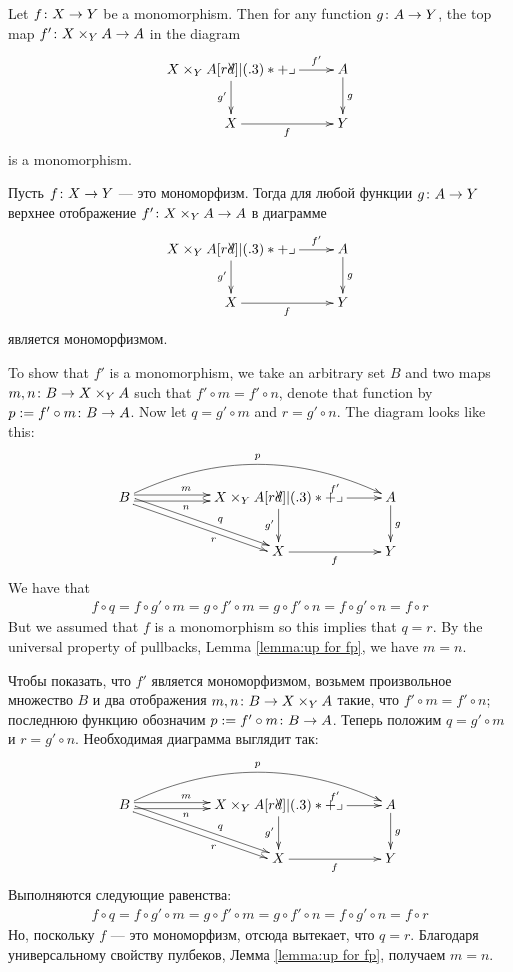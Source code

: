 \documentclass[CT4S-EN-RU]{subfiles}
\begin{document}
\begin{propositionENG}\label{prop:pb preserve mono}
Let $f\colon X\rightarrow Y$ be a monomorphism. Then for any function $g\colon A\rightarrow Y$, the top map $f'\colon X\times_YA\rightarrow A$ in the diagram
$$
\xymatrix{X\times_YA\ar[r]^-{f'}\ar[d]_{g'}\ullimit&A\ar[d]^g\\X\ar[r]_f&Y}
$$
is a monomorphism.
\end{propositionENG}

\begin{propositionRUS}\label{prop:pb preserve mono}
Пусть $f\colon X\rightarrow Y$ — это мономорфизм. Тогда для любой функции $g\colon A\rightarrow Y$ верхнее отображение $f'\colon X\times_YA\rightarrow A$ в диаграмме
$$
\xymatrix{X\times_YA\ar[r]^-{f'}\ar[d]_{g'}\ullimit&A\ar[d]^g\\X\ar[r]_f&Y}
$$
является мономорфизмом.
\end{propositionRUS}

\begin{proofENG}
To show that $f'$ is a monomorphism, we take an arbitrary set $B$ and two maps $m,n\colon B\rightarrow X\times_YA$ such that $f'\circ m=f'\circ n$, denote that function by $p:=f'\circ m\colon B\rightarrow A$. Now let $q=g'\circ m$ and $r=g'\circ n$. The diagram looks like this:
$$
\xymatrix{B\ar@<.5ex>[rr]^(.4)m\ar@<-.5ex>[rr]_(.4)n\ar@/^2pc/[rrr]^p\ar@<.5ex>[drr]^(.6)q\ar@<-.5ex>[drr]_(.6)r&&X\times_YA\ar[r]^{f'}\ar[d]_{g'}\ullimit&A\ar[d]^g\\&&X\ar[r]_f&Y}
$$
We have that 
\begin{align*}f\circ q=f\circ g'\circ m=g\circ f'\circ m=g\circ f'\circ n=f\circ g'\circ n=f\circ r\end{align*} 
But we assumed that $f$ is a monomorphism so this implies that $q=r$. By the universal property of pullbacks, Lemma \ref{lemma:up for fp}, we have $m=n$.
\end{proofENG}

\begin{proofRUS}
Чтобы показать, что $f'$ является мономорфизмом, возьмем произвольное множество $B$ и два отображения $m,n\colon B\rightarrow X\times_YA$ такие, что $f'\circ m=f'\circ n$; последнюю функцию обозначим $p:=f'\circ m\colon B\rightarrow A$. Теперь положим $q=g'\circ m$ и $r=g'\circ n$. Необходимая диаграмма выглядит так:
$$
\xymatrix{B\ar@<.5ex>[rr]^(.4)m\ar@<-.5ex>[rr]_(.4)n\ar@/^2pc/[rrr]^p\ar@<.5ex>[drr]^(.6)q\ar@<-.5ex>[drr]_(.6)r&&X\times_YA\ar[r]^{f'}\ar[d]_{g'}\ullimit&A\ar[d]^g\\&&X\ar[r]_f&Y}
$$
Выполняются следующие равенства:
\begin{align*}f\circ q=f\circ g'\circ m=g\circ f'\circ m=g\circ f'\circ n=f\circ g'\circ n=f\circ r\end{align*} 
Но, поскольку $f$ — это мономорфизм, отсюда вытекает, что $q=r$. Благодаря универсальному свойству пулбеков, Лемма \ref{lemma:up for fp}, получаем $m=n$.
\end{proofRUS}
\end{document}
